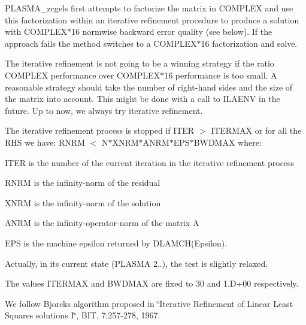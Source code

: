 P\+L\+A\+S\+M\+A\+\_\+zcgels first attempts to factorize the matrix in C\+O\+M\+P\+L\+E\+X and use this factorization within an iterative refinement procedure to produce a solution with C\+O\+M\+P\+L\+E\+X$\ast$16 normwise backward error quality (see below). If the approach fails the method switches to a C\+O\+M\+P\+L\+E\+X$\ast$16 factorization and solve.

The iterative refinement is not going to be a winning strategy if the ratio C\+O\+M\+P\+L\+E\+X performance over C\+O\+M\+P\+L\+E\+X$\ast$16 performance is too small. A reasonable strategy should take the number of right-\/hand sides and the size of the matrix into account. This might be done with a call to I\+L\+A\+E\+N\+V in the future. Up to now, we always try iterative refinement.

The iterative refinement process is stopped if I\+T\+E\+R $>$ I\+T\+E\+R\+M\+A\+X or for all the R\+H\+S we have\+: R\+N\+R\+M $<$ N$\ast$\+X\+N\+R\+M$\ast$\+A\+N\+R\+M$\ast$\+E\+P\+S$\ast$\+B\+W\+D\+M\+A\+X where\+:


\begin{DoxyItemize}
\item I\+T\+E\+R is the number of the current iteration in the iterative refinement process
\item R\+N\+R\+M is the infinity-\/norm of the residual
\item X\+N\+R\+M is the infinity-\/norm of the solution
\item A\+N\+R\+M is the infinity-\/operator-\/norm of the matrix A
\item E\+P\+S is the machine epsilon returned by D\+L\+A\+M\+C\+H(\textquotesingle{}Epsilon\textquotesingle{}).
\end{DoxyItemize}

Actually, in its current state (P\+L\+A\+S\+M\+A 2..), the test is slightly relaxed.

The values I\+T\+E\+R\+M\+A\+X and B\+W\+D\+M\+A\+X are fixed to 30 and 1.\+D+00 respectively.

We follow Bjorck\textquotesingle{}s algorithm proposed in \char`\"{}\+Iterative Refinement of Linear
 Least Squares solutions I\char`\"{}, B\+I\+T, 7\+:257-\/278, 1967.


